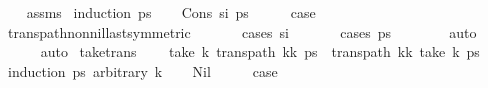 \begin{isabellebody}
%
\isadelimproof
\ \ %
\endisadelimproof
%
\isatagproof
{}\isamarkupfalse%
\ assms\isanewline
{}\isamarkupfalse%
\ {\isacharparenleft}{\kern0pt}induction\ ps{\isacharparenright}{\kern0pt}\isanewline
\ \ \isamarkupfalse%
\ {\isacharparenleft}{\kern0pt}Cons\ s\isactrlsub i\ ps{\isacharparenright}{\kern0pt}\isanewline
\ \ \isamarkupfalse%
\ \isamarkupfalse%
\ {\isacharquery}{\kern0pt}case\ \isanewline
\ \ \ \ \isamarkupfalse%
\ trans{\isacharunderscore}{\kern0pt}path{\isacharunderscore}{\kern0pt}non{\isacharunderscore}{\kern0pt}nil{\isacharunderscore}{\kern0pt}last{\isacharbrackleft}{\kern0pt}symmetric{\isacharbrackright}{\kern0pt}\ \isanewline
\ \ \ \ \isamarkupfalse%
\ {\isacharparenleft}{\kern0pt}cases\ s\isactrlsub i{\isacharparenright}{\kern0pt}\ \isanewline
\ \ \ \ \isamarkupfalse%
\ {\isacharparenleft}{\kern0pt}cases\ {\isachardoublequoteopen}ps\ {\isacharequal}{\kern0pt}\ {\isacharbrackleft}{\kern0pt}{\isacharbrackright}{\kern0pt}{\isachardoublequoteclose}{\isacharparenright}{\kern0pt}\isanewline
\ \ \ \ \isamarkupfalse%
\ auto\isanewline
\ \ \ \ \isamarkupfalse%
\isanewline
{}\isamarkupfalse%
\ {\isacharparenleft}{\kern0pt}auto{\isacharparenright}{\kern0pt}%
\endisatagproof
{\isafoldproof}%
%
\isadelimproof
\isanewline
%
\endisadelimproof
\isanewline
{}\isamarkupfalse%
\ take{\isacharunderscore}{\kern0pt}trans{\isacharcolon}{\kern0pt}\ \isanewline
\ \ \ {\isachardoublequoteopen}take\ k\ {\isacharparenleft}{\kern0pt}trans{\isacharunderscore}{\kern0pt}path\ {\isacharparenleft}{\kern0pt}kk\ ps{\isacharparenright}{\kern0pt}\ {\isacharequal}{\kern0pt}\ trans{\isacharunderscore}{\kern0pt}path\ {\isacharparenleft}{\kern0pt}kk\ {\isacharparenleft}{\kern0pt}take\ k\ ps{\isacharparenright}{\kern0pt}{\isachardoublequoteclose}\isanewline
%
\isadelimproof
%
\endisadelimproof
%
\isatagproof
{}\isamarkupfalse%
\ {\isacharparenleft}{\kern0pt}induction\ ps\ arbitrary{\isacharcolon}{\kern0pt}\ k{\isacharparenright}{\kern0pt}\isanewline
\ \ \isamarkupfalse%
\ Nil\isanewline
\ \ \isamarkupfalse%
\ \isamarkupfalse%
\ {\isacharquery}{\kern0pt}case\ \isamarkupfalse%

\end{isabellebody}
